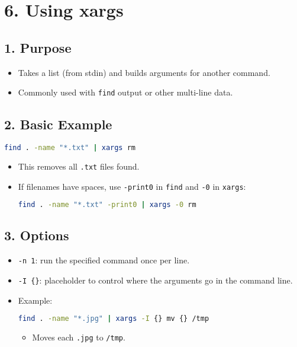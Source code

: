 \documentclass[a4paper]{report}
\begin{document}
\section*{6. Using xargs}

\subsection*{1. Purpose}
\begin{itemize}
    \item Takes a list (from stdin) and builds arguments for another command.  
    \item Commonly used with \texttt{find} output or other multi-line data.
\end{itemize}

\subsection*{2. Basic Example}
\begin{lstlisting}[language=bash]
find . -name "*.txt" | xargs rm
\end{lstlisting}

\begin{itemize}
    \item This removes all \texttt{.txt} files found.  
    \item If filenames have spaces, use \texttt{-print0} in \texttt{find} and \texttt{-0} in \texttt{xargs}:
\begin{lstlisting}[language=bash]
find . -name "*.txt" -print0 | xargs -0 rm
\end{lstlisting}

\end{itemize}

\subsection*{3. Options}
\begin{itemize}
    \item \texttt{-n 1}: run the specified command once per line.  
    \item \texttt{-I \{\}}: placeholder to control where the arguments go in the command line.
    \item Example:


\begin{lstlisting}[language=bash]
find . -name "*.jpg" | xargs -I {} mv {} /tmp
\end{lstlisting}


\begin{itemize}
    \item Moves each \texttt{.jpg} to \texttt{/tmp}.
\end{itemize}
\end{itemize}
\end{document}
